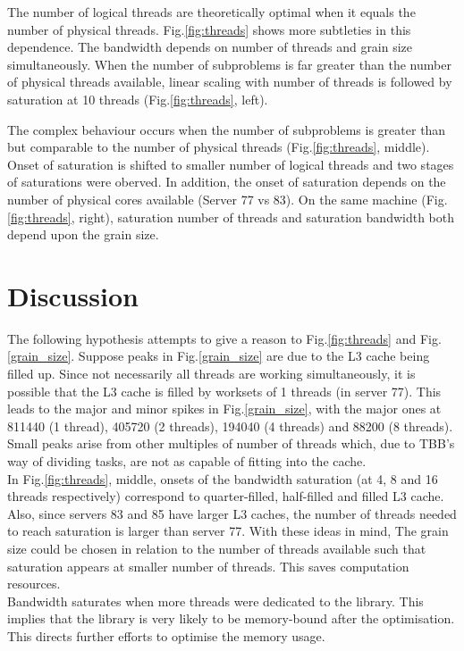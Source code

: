 \documentclass[journal]{IEEEtran}
\begin{document}
The number of logical threads are theoretically optimal when it equals the number of physical threads. Fig.\ref{fig:threads} shows more subtleties in this dependence. The bandwidth depends on number of threads and grain size simultaneously. When the number of subproblems is far greater than the number of physical threads available, linear scaling with number of threads is followed by saturation at 10 threads (Fig.\ref{fig:threads}, left). 

The complex behaviour occurs when the number of subproblems is greater than but comparable to the number of physical threads (Fig.\ref{fig:threads}, middle). Onset of saturation is shifted to smaller number of logical threads and two stages of saturations were oberved. In addition, the onset of saturation depends on the number of physical cores available (Server 77 vs 83). On the same machine (Fig.\ref{fig:threads}, right), saturation number of threads and saturation bandwidth both depend upon the grain size. \\

\section{Discussion}
The following hypothesis attempts to give a reason to Fig.\ref{fig:threads} and Fig.\ref{grain_size}. Suppose peaks in Fig.\ref{grain_size} are due to the L3 cache being filled up. Since not necessarily all threads are working simultaneously, it is possible that the L3 cache is filled by worksets of 1 threads (in server 77). This leads to the major and minor spikes in Fig.\ref{grain_size}, with the major ones at 811440 (1 thread), 405720 (2 threads), 194040 (4 threads) and 88200 (8 threads). Small peaks arise from other multiples of number of threads which, due to TBB's way of dividing tasks, are not as capable of fitting into the cache. \\

In Fig.\ref{fig:threads}, middle, onsets of the bandwidth saturation (at 4, 8 and 16 threads respectively) correspond to quarter-filled, half-filled and filled L3 cache. Also, since servers 83 and 85 have larger L3 caches, the number of threads needed to reach saturation is larger than server 77. With these ideas in mind, The grain size could be chosen in relation to the number of threads available such that saturation appears at smaller number of threads. This saves computation resources. \\

Bandwidth saturates when more threads were dedicated to the library. This implies that the library is very likely to be memory-bound after the optimisation. This directs further efforts to optimise the memory usage.
\end{document}
